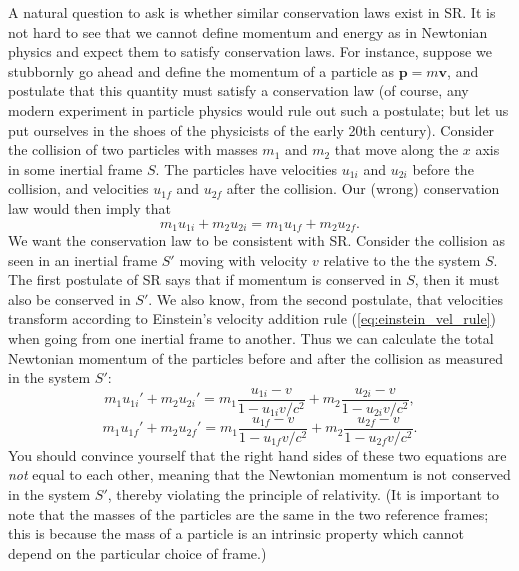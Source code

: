 A natural question to ask is whether similar conservation laws exist in SR. It is not hard to see that we cannot define momentum and energy as in Newtonian physics and expect them to satisfy conservation laws. For instance, suppose we stubbornly go ahead and define the momentum of a particle as $\mathbf{p}=m\mathbf{v}$, and postulate that this quantity must satisfy a conservation law (of course, any modern experiment in particle physics would rule out such a postulate; but let us put ourselves in the shoes of the physicists of the early 20th century). Consider the collision of two particles with masses $m_1$ and $m_2$ that move along the $x$ axis in some inertial frame $S$. The particles have velocities $u_{1i}$ and $u_{2i}$ before the collision, and velocities $u_{1f}$ and $u_{2f}$ after the collision. Our (wrong) conservation law would then imply that
\begin{equation}
m_1u_{1i}+m_2u_{2i}=m_1u_{1f}+m_2u_{2f}.
\end{equation}
We want the conservation law to be consistent with SR. Consider the collision as seen in an inertial frame $S'$ moving with velocity $v$ relative to the the system $S$. The first postulate of SR says that if momentum is conserved in $S$, then it must also be conserved in $S'$. We also know, from the second postulate, that velocities transform according to Einstein's velocity addition rule (\ref{eq:einstein_vel_rule}) when going from one inertial frame to another. Thus we can calculate the total Newtonian momentum of the particles before and after the collision as measured in the system $S'$:
\begin{equation}
m_1u_{1i}'+m_2u_{2i}'=m_1\frac{u_{1i}-v}{1-u_{1i}v/c^2}+m_2\frac{u_{2i}-v}{1-u_{2i}v/c^2},
\end{equation}
\begin{equation}
m_1u_{1f}'+m_2u_{2f}'=m_1\frac{u_{1f}-v}{1-u_{1f}v/c^2}+m_2\frac{u_{2f}-v}{1-u_{2f}v/c^2}.
\end{equation}
You should convince yourself that the right hand sides of these two equations are {\it not} equal to each other, meaning that the Newtonian momentum is not conserved in the system $S'$, thereby violating the principle of relativity. (It is important to note that the masses of the particles are the same in the two reference frames; this is because the mass of a particle is an intrinsic property which cannot depend on the particular choice of frame.)

\par\vspace{\baselineskip}


